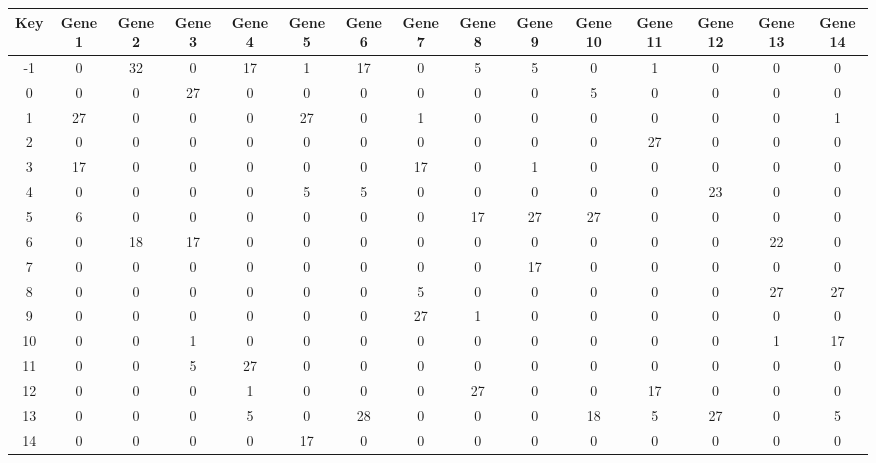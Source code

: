 \begin{tabular}{|c|c|c|c|c|c|c|c|c|c|c|c|c|c|c|}
\hline
Key & Gene 1 & Gene 2 & Gene 3 & Gene 4 & Gene 5 & Gene 6 & Gene 7 & Gene 8 & Gene 9 & Gene 10 & Gene 11 & Gene 12 & Gene 13 & Gene 14 \\
\hline
-1 & 0 & 32 & 0 & 17 & 1 & 17 & 0 & 5 & 5 & 0 & 1 & 0 & 0 & 0 \\
0 & 0 & 0 & 27 & 0 & 0 & 0 & 0 & 0 & 0 & 5 & 0 & 0 & 0 & 0 \\
1 & 27 & 0 & 0 & 0 & 27 & 0 & 1 & 0 & 0 & 0 & 0 & 0 & 0 & 1 \\
2 & 0 & 0 & 0 & 0 & 0 & 0 & 0 & 0 & 0 & 0 & 27 & 0 & 0 & 0 \\
3 & 17 & 0 & 0 & 0 & 0 & 0 & 17 & 0 & 1 & 0 & 0 & 0 & 0 & 0 \\
4 & 0 & 0 & 0 & 0 & 5 & 5 & 0 & 0 & 0 & 0 & 0 & 23 & 0 & 0 \\
5 & 6 & 0 & 0 & 0 & 0 & 0 & 0 & 17 & 27 & 27 & 0 & 0 & 0 & 0 \\
6 & 0 & 18 & 17 & 0 & 0 & 0 & 0 & 0 & 0 & 0 & 0 & 0 & 22 & 0 \\
7 & 0 & 0 & 0 & 0 & 0 & 0 & 0 & 0 & 17 & 0 & 0 & 0 & 0 & 0 \\
8 & 0 & 0 & 0 & 0 & 0 & 0 & 5 & 0 & 0 & 0 & 0 & 0 & 27 & 27 \\
9 & 0 & 0 & 0 & 0 & 0 & 0 & 27 & 1 & 0 & 0 & 0 & 0 & 0 & 0 \\
10 & 0 & 0 & 1 & 0 & 0 & 0 & 0 & 0 & 0 & 0 & 0 & 0 & 1 & 17 \\
11 & 0 & 0 & 5 & 27 & 0 & 0 & 0 & 0 & 0 & 0 & 0 & 0 & 0 & 0 \\
12 & 0 & 0 & 0 & 1 & 0 & 0 & 0 & 27 & 0 & 0 & 17 & 0 & 0 & 0 \\
13 & 0 & 0 & 0 & 5 & 0 & 28 & 0 & 0 & 0 & 18 & 5 & 27 & 0 & 5 \\
14 & 0 & 0 & 0 & 0 & 17 & 0 & 0 & 0 & 0 & 0 & 0 & 0 & 0 & 0 \\
\hline
\end{tabular}